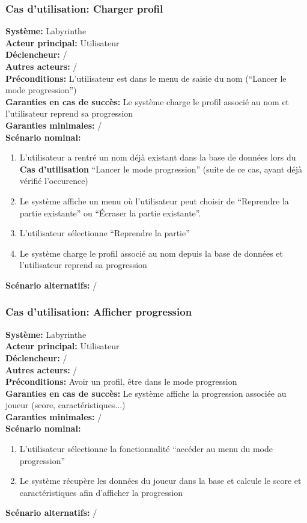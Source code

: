 \documentclass{butexFR}
\begin{document}
\subsubsection{Cas d’utilisation: Charger profil}
\textbf{Système:} Labyrinthe\\
\textbf{Acteur principal:} Utilisateur\\
\textbf{Déclencheur:} /\\
\textbf{Autres acteurs:} /\\[0.25em]
\textbf{Préconditions:} L'utilisateur est dans le menu de saisie du nom (``Lancer le mode progression'')\\
\textbf{Garanties en cas de succès:} Le système charge le profil associé au nom et l'utilisateur reprend sa progression\\
\textbf{Garanties minimales:} /\\[0.25em]
\textbf{Scénario nominal:}
\begin{enumerate}
    \item L'utilisateur a rentré un nom déjà existant dans la base de données lors du \textbf{Cas d'utilisation} ``Lancer le mode progression'' (suite de ce cas, ayant déjà vérifié l'occurence)
    \item Le système affiche un menu où l'utilisateur peut choisir de ``Reprendre la partie existante'' ou ``Écraser la partie existante''.
    \item L'utilisateur sélectionne ``Reprendre la partie''
    \item Le système charge le profil associé au nom depuis la base de données et l'utilisateur reprend sa progression
\end{enumerate}
\textbf{Scénario alternatifs:} /

\newpage

\subsubsection{Cas d’utilisation: Afficher progression}
\textbf{Système:} Labyrinthe\\
\textbf{Acteur principal:} Utilisateur\\
\textbf{Déclencheur:} /\\
\textbf{Autres acteurs:} /\\[0.25em]
\textbf{Préconditions:} Avoir un profil, être dans le mode progression\\
\textbf{Garanties en cas de succès:} Le système affiche la progression associée au joueur (score, caractéristiques...)\\
\textbf{Garanties minimales:} /\\[0.25em]
\textbf{Scénario nominal:}
\begin{enumerate}
    \item L'utilisateur sélectionne la fonctionnalité ``accéder au menu du mode progression''
    \item Le système récupère les données du joueur dans la base et calcule le score et caractéristiques afin d'afficher la progression
\end{enumerate}
\textbf{Scénario alternatifs:} /
\end{document}
